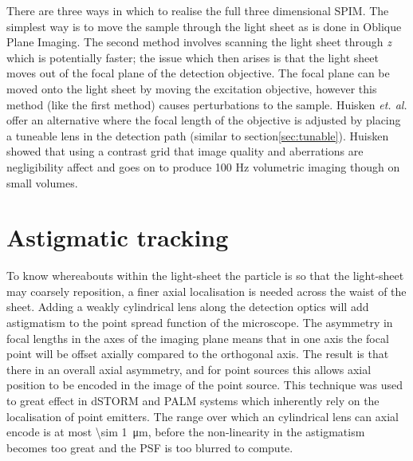 There are three ways in which to realise the full three dimensional SPIM.
The simplest way is to move the sample through the light sheet as is done in Oblique Plane Imaging.
The second method involves scanning the light sheet through \textit{z} which is potentially faster; the issue which then arises is that the light sheet moves out of the focal plane of the detection objective.
The focal plane can be moved onto the light sheet by moving the excitation objective, however this method (like the first method) causes perturbations to the sample.
Huisken \emph{et. al.} offer an alternative where the focal length of the objective is adjusted by placing a tuneable lens in the detection path (similar to section\ref{sec:tunable})\cite{Fahrbach2013}.
Huisken showed that using a contrast grid that image quality and aberrations are negligibility affect and goes on to produce 100 Hz volumetric imaging though on small volumes\cite{Fahrbach2013}.

\section{Astigmatic tracking}

To know whereabouts within the light-sheet the particle is so that the light-sheet may coarsely reposition, a finer axial localisation is needed across the waist of the sheet.
Adding a weakly cylindrical lens along the detection optics will add astigmatism to the point spread function of the microscope.
The asymmetry in focal lengths in the axes of the imaging plane means that in one axis the focal point will be offset axially compared to the orthogonal axis.
The result is that there in an overall axial asymmetry, and for point sources this allows axial position to be encoded in the image of the point source.
This technique was used to great effect in dSTORM and PALM systems which inherently rely on the localisation of point emitters.
The range over which an cylindrical lens can axial encode is at most \SI{\sim 1}{\micro\metre}, before the non-linearity in the astigmatism becomes too great and the PSF is too blurred to compute.

